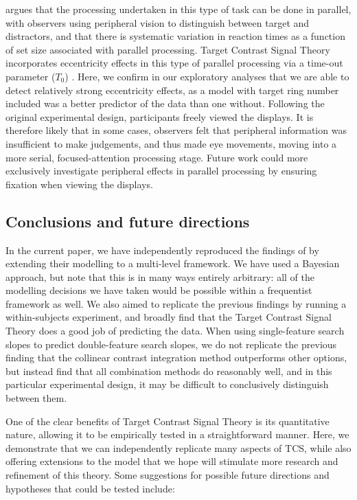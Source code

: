 \documentclass[preprint,12pt,authoryear]{elsarticle}
\begin{document}
\citep{buetti2019predicting} argues that the processing undertaken in this type of task can be done in parallel, with observers using peripheral vision to distinguish between target and distractors, and that there is systematic variation in reaction times as a function of set size associated with parallel processing. Target Contrast Signal Theory incorporates eccentricity effects in this type of parallel processing via a time-out parameter ($T_0$) \citep{lleras2020target, wang2018parallel, ng2018fixed}. Here, we confirm in our exploratory analyses that we are able to detect relatively strong eccentricity effects, as a model with target ring number included was a better predictor of the data than one without. Following the original experimental design, participants freely viewed the displays. It is therefore likely that in some cases, observers felt that peripheral information was insufficient to make judgements, and thus made eye movements, moving into a more serial, focused-attention processing stage. Future work could more exclusively investigate peripheral effects in parallel processing by ensuring fixation when viewing the displays.


\subsection{Conclusions and future directions}

In the current paper, we have independently reproduced the findings of \cite{buetti2019predicting} by extending their modelling to a multi-level framework. We have used a Bayesian approach, but note that this is in many ways entirely arbitrary: all of the modelling decisions we have taken would be possible within a frequentist framework as well. We also aimed to replicate the previous findings by running a within-subjects experiment, and broadly find that the Target Contrast Signal Theory does a good job of predicting the data. When using single-feature search slopes to predict double-feature search slopes, we do not replicate the previous finding that the collinear contrast integration method outperforms other options, but instead find that all combination methods do reasonably well, and in this particular experimental design, it may be difficult to conclusively distinguish between them.

One of the clear benefits of Target Contrast Signal Theory \citep{lleras2020target} is its quantitative nature, allowing it to be empirically tested in a straightforward manner. Here, we demonstrate that we can independently replicate many aspects of TCS, while also offering extensions to the model that we hope will stimulate more research and refinement of this theory. Some suggestions for possible future directions and hypotheses that could be tested include:
\end{document}

